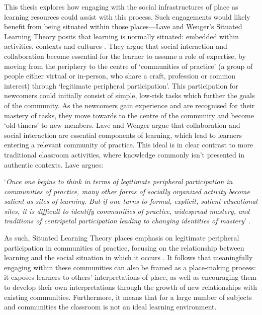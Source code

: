 This thesis explores how engaging with the social infrastructures of place as learning resources could assist with this process. Such engagements would likely benefit from being situated within those places---Lave and Wenger's Situated Learning Theory posits that learning is normally situated: embedded within activities, contexts and cultures \citep{lave1991situated}. They argue that social interaction and collaboration become essential for the learner to assume a role of expertise, by moving from the periphery to the centre of `communities of practice' (a group of people either virtual or in-person, who share a craft, profession or common interest) through `legitimate peripheral participation'. This participation for newcomers could initially consist of simple, low-risk tasks which further the goals of the community. As the newcomers gain experience and are recognised for their mastery of tasks, they move towards to the centre of the community and become `old-timers' to new members. Lave and Wenger argue that collaboration and social interaction are essential components of learning, which lead to learners entering a relevant community of practice. This ideal is in clear contrast to more traditional classroom activities, where knowledge commonly isn't presented in authentic contexts. Lave argues:

\begin{displayquote}
`\textit{Once one begins to think in terms of legitimate peripheral participation in communities of practice, many other forms of socially organized activity become salient as sites of learning. But if one turns to formal, explicit, salient educational sites, it is difficult to identify communities of practice, widespread mastery, and traditions of centripetal participation leading to changing identities of mastery}' \citep{Lave1991}. 
\end{displayquote}

As such, Situated Learning Theory places emphasis on legitimate peripheral participation in communities of practice, focusing on the relationship between learning and the social situation in which it occurs \citep{lave1991situated}. It follows that meaningfully engaging within these communities can also be framed as a place-making process: it exposes learners to others' interpretations of place, as well as encouraging them to develop their own interpretations through the growth of new relationships with existing communities. Furthermore, it means that for a large number of subjects and communities the classroom is not an ideal learning environment. 

